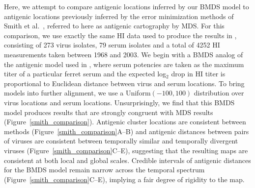 \documentclass[11pt,oneside,letterpaper]{article}
\begin{document}
Here, we attempt to compare antigenic locations inferred by our BMDS model to antigenic locations previously inferred by the error minimization methods of Smith et al.\ \cite{Smith04}, referred to here as antigenic cartography by MDS.
For this comparison, we use exactly the same HI data used to produce the results in \cite{Smith04}, consisting of 273 virus isolates, 79 serum isolates and a total of 4252 HI measurements taken between 1968 and 2003.
We begin with a BMDS analog of the antigenic model used in \cite{Smith04}, where serum potencies are taken as the maximum titer of a particular ferret serum and the expected log$_2$ drop in HI titer is proportional to Euclidean distance between virus and serum locations.
To bring models into further alignment, we use a Uniform$(-100,100)$ distribution over virus locations and serum locations.
Unsurprisingly, we find that this BMDS model produces results that are strongly congruent with MDS results (Figure~\ref{smith_comparison}).
Antigenic cluster locations are consistent between methods (Figure~\ref{smith_comparison}A--B) and antigenic distances between pairs of viruses are consistent between temporally similar and temporally divergent viruses (Figure~\ref{smith_comparison}C--E), suggesting that the resulting maps are consistent at both local and global scales.
Credible intervals of antigenic distances for the BMDS model remain narrow across the temporal spectrum (Figure~\ref{smith_comparison}C--E), implying a fair degree of rigidity to the map.
\end{document}
